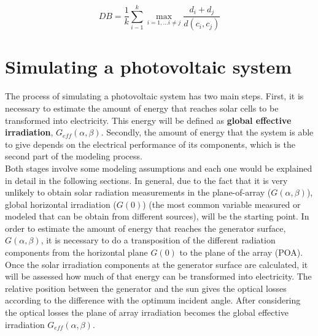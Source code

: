 \begin{equation}\label{eq:davies}
    DB =\frac{1}{k}\sum_{i-1}^{k}\max_{i=1,...i\neq{j}}{\frac{d_{i}+d_{j}}{d(c_i,c_j)}}
\end{equation}

\section{Simulating a photovoltaic system}

The process of simulating a photovoltaic system has two main steps. First, it is necessary to estimate the amount of energy that reaches solar cells to be transformed into electricity. This energy will be defined as \textbf{global effective irradiation}, $G_{eff}(\alpha, \beta)$. Secondly, the amount of energy that the system is able to give depends on the electrical performance of its components, which is the second part of the modeling process.\\

Both stages involve some modeling assumptions and each one would be explained in detail in the following sections. In general, due to the fact that it is very unlikely to obtain solar radiation measurements in the plane-of-array ($G(\alpha, \beta)$), global horizontal irradiation ($G(0)$) (the most common variable measured or modeled that can be obtain from different sources), will be the starting point. In order to estimate the amount of energy that reaches the generator surface, $G(\alpha, \beta)$, it is necessary to do a transposition of the different radiation components from the horizontal plane $G(0)$ to the plane of the array (POA).\\

Once the solar irradiation components at the generator surface are calculated, it will be assessed how much of that energy can be transformed into electricity. The relative position between the generator and the sun gives the optical losses according to the difference with the optimum incident angle. After considering the optical losses the plane of array irradiation becomes the global effective irradiation $G_{eff}(\alpha, \beta)$.\\

